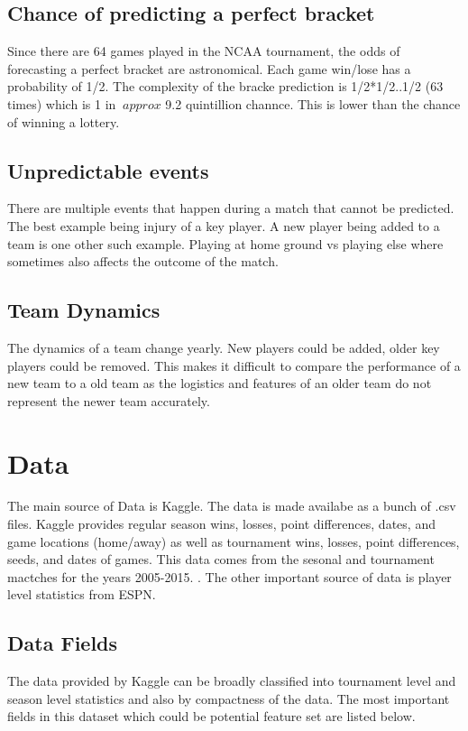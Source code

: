 \documentclass{article}
\begin{document}
\begin{multicols}{2}
	\subsection{Chance of predicting a perfect bracket}
	Since there are 64 games played in the NCAA tournament,
the odds of forecasting a perfect bracket are astronomical. Each game win/lose has a probability of 1/2. The complexity of the bracke prediction is 1/2*1/2..1/2 (63 times) which is 1 in $~approx$ 9.2 quintillion channce. This is lower than the chance of winning a lottery.

	\subsection{Unpredictable events}
	There are multiple events that happen during a match that cannot be predicted. The best example being injury of a key player. A new player being added to a team is one other such example. Playing at home ground vs playing else where sometimes also affects the outcome of the match.
	
	\subsection{Team Dynamics}
	The dynamics of a team change yearly. New players could be added, older key players could be removed. This makes it difficult to compare the performance of a new team to a old team as the logistics and features of an older team do not represent the newer team accurately. 
	
	\section{Data}
	The main source of Data is Kaggle. The data is made availabe as a bunch of .csv files. Kaggle provides regular season wins, losses, point differences, dates, and game locations (home/away) as well as tournament wins, losses, point differences, seeds, and dates of games. This data comes from the sesonal and tournament mactches for the years 2005-2015. \cite{1}. The other important source of data is player level statistics from ESPN.
	
	\subsection{Data Fields}
	The data provided by Kaggle can be broadly classified into tournament level and season level statistics and also by compactness of the data. The most important fields in this dataset which could be potential feature set are listed below.  \cite{1}
	

\end{multicols}
\end{document}
